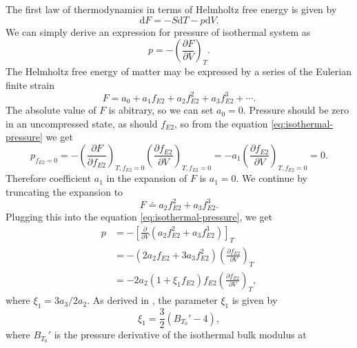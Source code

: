 The first law of thermodynamics in terms of Helmholtz free energy is given by
\begin{equation}
  \mathrm{d}F = - S \mathrm{d}T - p \mathrm{d}V.
\end{equation}
We can simply derive an expression for pressure of isothermal system as
\begin{equation}
  p = - \left(\frac{\partial F}{\partial V}\right)_T.
  \label{eq:isothermal-pressure}
\end{equation}
The Helmholtz free energy of matter may be expressed by a series of the
Eulerian finite strain
\begin{equation}
  F = a_0 + a_1 f_{E2} + a_2 f_{E2}^2 + a_3 f_{E2}^3 + \cdots.
\end{equation}
The absolute value of $F$ is abitrary, so we can set $a_0 = 0$. Pressure
should be zero in an uncompressed state, as should $f_{E2}$, so from the
equation \eqref{eq:isothermal-pressure} we get
\begin{equation}
  p_{f_{E2}=0} = - \left(
    \frac{\partial F}{\partial f_{E2}}
  \right)_{T,f_{E2}=0} \left(
    \frac{\partial f_{E2}}{\partial V}
  \right)_{T, f_{E2}=0} = -a_1 \left(
    \frac{\partial f_{E2}}{\partial V}
  \right)_{T, f_{E2}=0} = 0.
\end{equation}
Therefore coefficient $a_1$ in the expansion of $F$ is $a_1 = 0$. We continue
by truncating the expansion to
\begin{equation}
  F \doteq a_2 f_{E2}^2 + a_3 f_{E2}^3.
\end{equation}
Plugging this into the equation \eqref{eq:isothermal-pressure}, we get
\begin{equation}
\begin{alignedat}{2}
  p &= -\left[
    \frac{\partial}{\partial V}(a_2 f_{E2}^2 + a_3 f_{E2}^3)
  \right]_T \\
  &= - (2 a_2 f_{E2} + 3 a_3 f_{E2}^2)
  \left( \frac{\partial f_{E2}}{\partial V}\right)_T \\
  &= -2 a_2 (1 + \xi_1 f_{E2}) f_{E2} \left(
    \frac{\partial f_{E2}}{\partial V}
  \right)_T,
  \label{eq:pressure}
\end{alignedat}
\end{equation}
where $\xi_1 = 3 a_3/2 a_2$. As derived in \cite{min9120745}, the parameter
$\xi_1$ is given by
\begin{equation}
  \xi_1 = \frac{3}{2}\left(B_{T_0}' - 4\right),
  \label{eqn:xi_1}
\end{equation}
where $B_{T_0}'$ is the pressure derivative of the isothermal bulk modulus at

